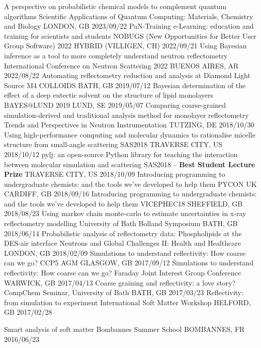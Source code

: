 \begin{cvhonors}
  \cvhonor
    {A perspective on probabilistic chemical models to complement quantum algorithms}
    {Scientific Applications of Quantum Computing: Materials, Chemistry and Biology}
    {LONDON, GB}
    {2023/09/22}
  \cvhonor
    {PaN-Training e-Learning: education and training for scientists and students}
    {NOBUGS (New Opportunities for Better User Group Software) 2022}
    {HYBRID (VILLIGEN, CH)}
    {2022/09/21}
  \cvhonor
    {Using Bayesian inference as a tool to more completely understand neutron reflectometry}
    {International Conference on Neutron Scattering 2022}
    {BUENOS AIRES, AR}
    {2022/08/22}
  \cvhonor
    {Automating reflectometry reduction and analysis at Diamond Light Source}
    {M4 COLLOIDS}
    {BATH, GB}
    {2019/07/12}
  \cvhonor
    {Bayesian determination of the effect of a deep eutectic solvent on the structure of lipid monolayers}
    {BAYES@LUND 2019}
    {LUND, SE}
    {2019/05/07}
  \cvhonor
    {Comparing coarse-grained simulation-derived and traditional analysis method for monolayer reflectometry}
    {Trends and Perspectives in Neutron Instrumentation}
    {TUTZING, DE}
    {2018/10/30}
  \cvhonor
    {Using high-performance computing and molecular dynamics to rationalise micelle structure from small-angle scattering}
    {SAS2018}
    {TRAVERSE CITY, US}
    {2018/10/12}
  \cvhonor
    {pylj: an open-source Python library for teaching the interaction between molecular simulation and scattering}
	{SAS2018 -- \textbf{Best Student Lecture Prize}}
    {TRAVERSE CITY, US}
    {2018/10/09}
  \cvhonor
    {Introducing programming to undergraduate chemists: and the tools we've developed to help them}
    {PYCON UK}
    {CARDIFF, GB}
    {2018/09/16}
  \cvhonor
    {Introducing programming to undergraduate chemists: and the tools we've developed to help them}
    {VICEPHEC18}
    {SHEFFIELD, GB}
    {2018/08/23}
  \cvhonor
    {Using markov chain monte-carlo to estimate uncertainties in x-ray reflectometry modelling}
    {University of Bath Bolland Symposium}
    {BATH, GB}
    {2018/06/14}
  \cvhonor
    {Probabilistic analysis of reflectometry data: Phospholipids at the DES-air interface}
    {Neutrons and Global Challenges II: Health and Healthcare}
    {LONDON, GB}
    {2018/02/09}
  \cvhonor
    {Simulations to understand reflectivity: How coarse can we go?}
    {CCP5 AGM}
    {GLASGOW, GB}
    {2017/09/12}
  \cvhonor
    {Simulations to understand reflectivity: How coarse can we go?}
    {Faraday Joint Interest Group Conference}
    {WARWICK, GB}
    {2017/04/13}
  \cvhonor
    {Coarse graining and reflectivity: a love story?}
    {CompChem Seminar, University of Bath}
    {BATH, GB}
    {2017/03/23}
  \cvhonor
    {Reflectivity: from simulation to experiment}
    {International Soft Matter Workshop}
    {HELFORD, GB}
    {2017/02/28}
\end{cvhonors}
\begin{cvhonors}
  \cvhonor
    {Smart analysis of soft matter}
    {Bombannes Summer School}
    {BOMBANNES, FR}
    {2016/06/23}
\end{cvhonors}
